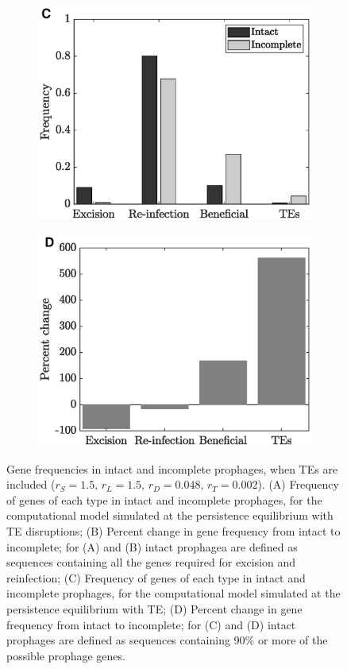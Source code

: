 \begin{figure}[H]
\begin{subfigure}[t]{0.50\textwidth}
        \includegraphics[scale=0.50]{BiTe190.eps}
    \end{subfigure}\hfill   \begin{subfigure}[t]{0.50\textwidth}
    \includegraphics[scale=0.50]{BiTe290.eps}
    \end{subfigure} \hfill    
     \caption[Gene frequencies in intact and incomplete prophages, when TEs are included and intact prophagea are defined as sequences containing all the genes required for excision and reinfection.]{Gene frequencies in intact and incomplete prophages, when TEs are included ($r_S = 1.5, \, r_L = 1.5, \, r_D = 0.048, \, r_T = 0.002$). (A) Frequency of genes of each type in intact and incomplete prophages, for the computational model simulated at the persistence equilibrium with TE disruptions; (B) Percent change in gene frequency from intact to incomplete;  for (A) and (B) intact prophagea are defined as sequences containing all the genes required for excision and reinfection; (C) Frequency of genes of each type in intact and incomplete prophages, for the computational model simulated at the persistence equilibrium with TE; (D) Percent change in gene frequency from intact to incomplete; for (C) and (D) intact prophages are defined as sequences containing 90\% or more of the possible prophage genes.}
     \label{fig:Biresultso}
     \end{figure}
% 
% 